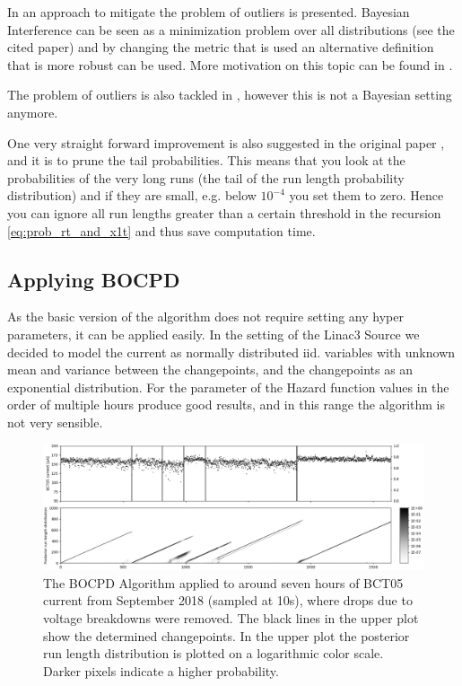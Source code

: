 \documentclass[12pt,a4paper]{article}
\begin{document}
In \cite{Knoblauch:DoublyRobustBayesian} an approach to mitigate the problem of outliers is presented. Bayesian Interference can be seen as a minimization problem over all distributions (see the cited paper) and by changing the metric that is used an alternative definition that is more robust can be used. More motivation on this topic can be found in \cite{Knoblauch:GeneralizedVariationalInference}.

The problem of outliers is also tackled in \cite{Fearnhead:ChangepointDetectionPresence}, however this is not a Bayesian setting anymore.

One very straight forward improvement is also suggested in the original paper \cite{Adams:BayesianOnlineChangepoint}, and it is to prune the tail probabilities. This means that you look at the probabilities of the very long runs (the tail of the run length probability distribution) and if they are small, e.g. below $10^{-4}$ you set them to zero. Hence you can ignore all run lengths greater than a certain threshold in the recursion \eqref{eq:prob_rt_and_x1t} and thus save computation time.

\subsection{Applying BOCPD}
As the basic version of the algorithm does not require setting any hyper parameters, it can be applied easily. In the setting of the Linac3 Source we decided to model the current as normally distributed iid. variables with unknown mean and variance between the changepoints, and the changepoints as an exponential distribution. For the parameter of the Hazard function values in the order of multiple hours produce good results, and in this range the algorithm is not very sensible.

\begin{figure}
	\centering
	\includegraphics{images/bocd_example.png}
	\caption{The BOCPD Algorithm applied to around seven hours of BCT05 current from September 2018 (sampled at 10s), where drops due to voltage breakdowns were removed. The black lines in the upper plot show the determined changepoints. In the upper plot the posterior run length distribution is plotted on a logarithmic color scale. Darker pixels indicate a higher probability.}
	\label{fig:bocd_example}
\end{figure}
\end{document}
